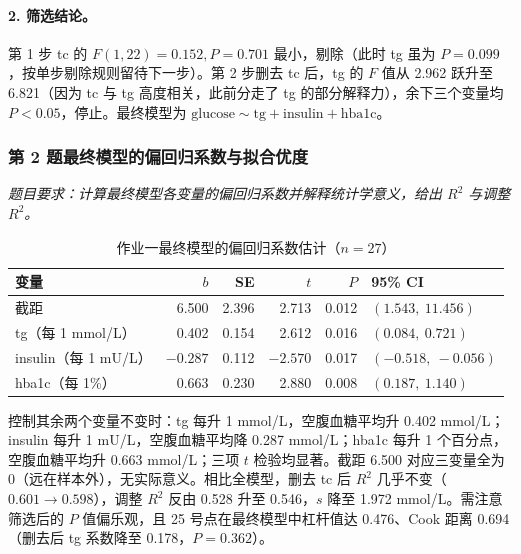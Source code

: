 \paragraph{2. 筛选结论。}第 1 步 tc 的 $F(1,22)=0.152,P=0.701$ 最小，剔除（此时 tg 虽为 $P=0.099$，按单步剔除规则留待下一步）。第 2 步删去 tc 后，tg 的 $F$ 值从 2.962 跃升至 6.821（因为 tc 与 tg 高度相关，此前分走了 tg 的部分解释力），余下三个变量均 $P<0.05$，停止。最终模型为 $\text{glucose}\sim\text{tg}+\text{insulin}+\text{hba1c}$。

\subsubsection*{第 2 题\quad 最终模型的偏回归系数与拟合优度}
\emph{题目要求：计算最终模型各变量的偏回归系数并解释统计学意义，给出 $R^2$ 与调整 $R^2$。}


\begin{table}[htbp]
\centering\small
\caption{作业一最终模型的偏回归系数估计（$n=27$）}
\begin{tabular}{@{}lrrrrl@{}}
\toprule
变量 & $b$ & SE & $t$ & $P$ & 95\% CI\\
\midrule
截距                  & 6.500  & 2.396 & 2.713  & 0.012 & $(1.543,\ 11.456)$\\
tg（每 1 mmol/L）     & 0.402  & 0.154 & 2.612  & 0.016 & $(0.084,\ 0.721)$\\
insulin（每 1 mU/L）  & $-0.287$ & 0.112 & $-2.570$ & 0.017 & $(-0.518,\ -0.056)$\\
hba1c（每 1\%）       & 0.663  & 0.230 & 2.880  & 0.008 & $(0.187,\ 1.140)$\\
\bottomrule
\end{tabular}
\end{table}

控制其余两个变量不变时：tg 每升 1 mmol/L，空腹血糖平均升 0.402 mmol/L；insulin 每升 1 mU/L，空腹血糖平均降 0.287 mmol/L；hba1c 每升 1 个百分点，空腹血糖平均升 0.663 mmol/L；三项 $t$ 检验均显著。截距 6.500 对应三变量全为 0（远在样本外），无实际意义。相比全模型，删去 tc 后 $R^2$ 几乎不变（$0.601$），调整 $R^2$ 反由 0.528 升至 0.546，$s$ 降至 1.972 mmol/L。需注意筛选后的 $P$ 值偏乐观，且 25 号点在最终模型中杠杆值达 0.476、Cook 距离 0.694（删去后 tg 系数降至 0.178，$P=0.362$）。

